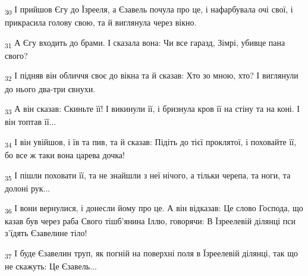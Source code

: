 \begin{tcolorbox}
\textsubscript{30} І прийшов Єгу до Їзрееля, а Єзавель почула про це, і нафарбувала очі свої, і прикрасила голову свою, та й виглянула через вікно.
\end{tcolorbox}
\begin{tcolorbox}
\textsubscript{31} А Єгу входить до брами. І сказала вона: Чи все гаразд, Зімрі, убивце пана свого?
\end{tcolorbox}
\begin{tcolorbox}
\textsubscript{32} І підняв він обличчя своє до вікна та й сказав: Хто зо мною, хто? І виглянули до нього два-три євнухи.
\end{tcolorbox}
\begin{tcolorbox}
\textsubscript{33} А він сказав: Скиньте її! І викинули її, і бризнула кров її на стіну та на коні. І він топтав її...
\end{tcolorbox}
\begin{tcolorbox}
\textsubscript{34} І він увійшов, і їв та пив, та й сказав: Підіть до тієї проклятої, і поховайте її, бо все ж таки вона царева дочка!
\end{tcolorbox}
\begin{tcolorbox}
\textsubscript{35} І пішли поховати її, та не знайшли з неї нічого, а тільки черепа, та ноги, та долоні рук...
\end{tcolorbox}
\begin{tcolorbox}
\textsubscript{36} І вони вернулися, і донесли йому про це. А він відказав: Це слово Господа, що казав був через раба Свого тішб'янина Іллю, говорячи: В Їзреелевій ділянці пси з'їдять Єзавелине тіло!
\end{tcolorbox}
\begin{tcolorbox}
\textsubscript{37} І буде Єзавелин труп, як погній на поверхні поля в Їзреелевій ділянці, так що не скажуть: Це Єзавель...
\end{tcolorbox}
